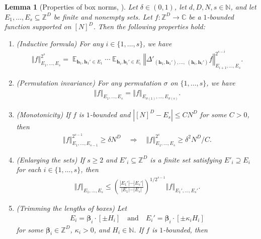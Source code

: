 \documentclass[11pt]{amsart}
\newtheorem{lemma}{Lemma}[section]
\theoremstyle{definition}
\DeclareMathOperator*{\E}{\mathbb{E}}
\newcommand{\C}{{\mathbb C}}
\newcommand{\N}{{\mathbb N}}
\newcommand{\Z}{{\mathbb Z}}
\newcommand{\bh}{{\mathbf{h}}}
\newcommand{\bbeta}{{\boldsymbol{\beta}}}
\newcommand{\norm}[1]{\left\Vert #1\right\Vert}
\newcommand{\brac}[1]{\mathopen{}\left( #1 \mathclose{}\right)}
\begin{document}
\begin{lemma}[{Properties of box norms, \cite[Lemma 3.5]{KKL24a}}]\label{L: properties of box norms}
Let $\delta\in(0, 1)$, let $d,D,N, s\in\N$,
and let $E_1, \ldots, E_s\subseteq \Z^D$ be finite {and nonempty} sets. Let $f:\Z^D\to\C$ be a $1$-bounded function supported on $[N]^D$. Then the following properties hold:
\begin{enumerate}
    \item\label{i: inductive formula} (Inductive formula) For any $i\in\{1, \ldots, s\}$, we have
    \begin{align*}
        \norm{f}_{E_1, \ldots, E_s}^{2^s} = \E_{\bh_1, \bh_1'\in E_1}\cdots \E_{\bh_i, \bh_i'\in E_i}\norm{\Delta'_{(\bh_1, \bh_1'), \ldots,\; (\bh_i, \bh_i')}f}_{E_{i+1}, \ldots, E_s}^{2^{s-i}}.
    \end{align*}
    \item\label{i: permutation invariance} (Permutation invariance) For any permutation $\sigma$ on $\{1, \ldots, s\}$, we have 
    \begin{align*}
        \norm{f}_{E_1, \ldots, E_s} = \norm{f}_{E_{\sigma(1)}, \ldots, E_{\sigma(s)}}.
    \end{align*}
    \item\label{i: monotonicity} (Monotonicity) If $f$ is $1$-bounded and $|[N]^D-E_s|\leq C N^D$ for some $C>0$, then 
    \begin{align}\label{E: monotonicity}
        \norm{f}_{E_1, \ldots, E_{s-1}}^{2^{s-1}}\geq \delta N^D \quad \Longrightarrow \quad \norm{f}_{E_1, \ldots, E_{s}}^{2^{s}}\geq \delta^2 N^D/C.
    \end{align}
    \item\label{i: enlarging} (Enlarging the sets) If $s\geq 2$ and $E'_i\subseteq \Z^D$ is a finite set satisfying $E'_i \supseteq E_i$ for each $i\in\{1,\ldots, s\}$, then 
    \begin{align*}
        \norm{f}_{E_1, \ldots, E_s}\leq \brac{\frac{|E_1'|\cdots|E_s'|}{|E_1|\cdots|E_s|}}^{1/2^{s-1}}\norm{f}_{E_1', \ldots, E_s'}.
    \end{align*}
    \item\label{i: trimming 2} (Trimming the lengths of boxes)  
    Let
    \begin{align*}
        E_i = \bbeta_{i}\cdot[\pm H_{i}]\quad \textrm{and}\quad E_i' = \bbeta_{i}\cdot[\pm \kappa_{i} H_{i}]
    \end{align*}
    for some $\bbeta_{i}\in \Z^D$, $\kappa_{i}>0$, and $H_{i}\in \N$. If $f$ is $1$-bounded, then
    \begin{align*}

\end{align*}
\end{enumerate}
\end{lemma}
\end{document}
